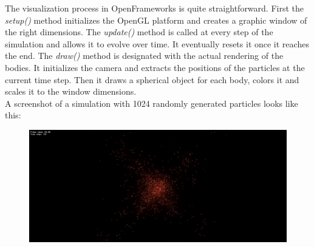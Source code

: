 \documentclass{article}
\begin{document}
The visualization process in OpenFrameworks is quite straightforward.
First the \textit{setup()} method initializes the OpenGL platform and creates a graphic window of the right dimensions.
The \textit{update()} method is called at every step of the simulation and allows it to evolve over time. It eventually resets it once it reaches the end. The \textit{draw()} method is designated with the actual rendering of the bodies. It initializes the camera and extracts the positions of the particles at the current time step. Then it draws a spherical object for each body, colors it and scales it to the window dimensions. \\

\noindent A screenshot of a simulation with 1024 randomly generated particles looks like this: 

\begin{figure} [h]
    \centering
    \includegraphics[width=1\textwidth]
    {images/1024_part_sim.png}
    \label{fig:my_label}
\end{figure}



\newpage
\printbibliography
\end{document}
